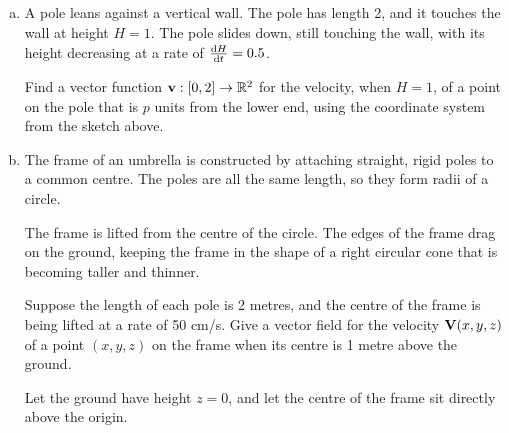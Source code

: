 \subsection*{\Application}
\begin{question}
\begin{enumerate}[a.]
\item 
A pole leans against a vertical wall. The pole has length 2, and it touches the wall at height $H=1$. The pole slides down, still touching the wall, with its height decreasing at a rate of $\diff{H}{t}=0.5$. 


\begin{center}
\end{center}
Find a vector function $\mathbf{v}:\mathbb [0,2] \to \mathbb R^2$ for the velocity, when $H=1$, of a point on the pole that is $p$ units from the lower end, using the coordinate system from the sketch above. 

\item The frame of an umbrella is constructed by attaching straight, rigid poles to a common centre. The poles are all the same length, so they form radii of a circle.

The frame is lifted from the centre of the circle. The edges of the frame drag on the ground, keeping the frame in the shape of a right circular cone that is becoming taller and thinner.

\begin{center}
\qquad 
{}
\end{center}

Suppose the length of each pole is 2 metres, and the centre of the frame is being lifted at a rate of 50 cm/s.  Give a vector field for the velocity $\mathbf{V}(x,y,z)$ of a point
           $(x,y,z)$ on the frame when its centre is 1 metre above the ground. 

Let the ground have height $z=0$, and let the centre of the frame sit directly above the origin. 
\end{enumerate}
\end{question}

